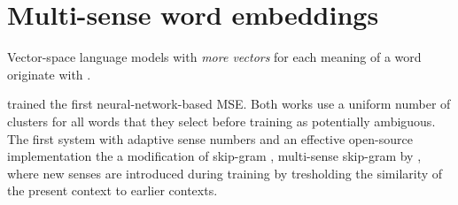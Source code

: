 \documentclass[11pt]{article}
\begin{document}

%



\section{Multi-sense word embeddings}

\todo{}

Vector-space language models with \emph{more vectors} for each meaning of a
word originate with \cite{Reisinger:2010}.

\cite{Huang:2012} trained the first neural-network-based MSE.
Both works use a uniform number of clusters for all words that they select
before training as
potentially ambiguous.
The first system with adaptive sense numbers and an effective open-source
implementation the a
modification of skip-gram \cite{Mikolov:2013d}, multi-sense skip-gram by
\cite{Neelakantan:2014}, where new senses are introduced during training by
tresholding the similarity of the present context to earlier contexts.

\end{document}
